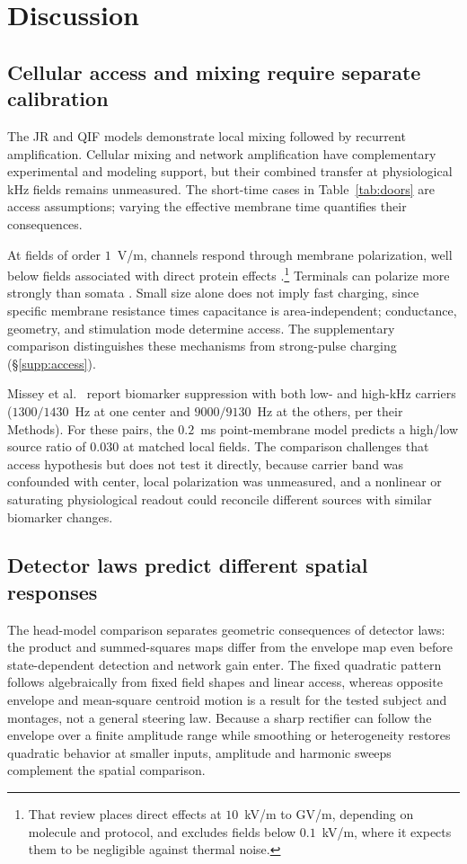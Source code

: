 \section{Discussion}\label{sec:discussion}
\subsection{Cellular access and mixing require separate calibration}
The JR and QIF models demonstrate local mixing followed by recurrent
amplification. Cellular mixing \cite{mirzakhalili2020,luff2024mixer} and network
amplification \cite{caldas2024,karimi2024,esmaeilpour2021} have complementary
experimental and modeling support, but their combined transfer at physiological
kHz fields remains unmeasured. The short-time cases in Table~\ref{tab:doors}
are access assumptions; varying the effective membrane time quantifies their
consequences.

At fields of order $1$~V/m, channels respond through membrane polarization,
well below fields associated with direct protein effects
\cite{cifra2026}.\footnote{That review places direct effects at $10$~kV/m
to GV/m, depending on molecule and protocol, and excludes fields below
$0.1$~kV/m, where it expects them to be negligible against thermal noise.}
Terminals can polarize more strongly than somata
\cite{rahman2013,aberra2023,chakraborty2018}. Small size alone does not imply
fast charging, since specific membrane resistance times capacitance is
area-independent; conductance, geometry, and stimulation mode determine access.
The supplementary comparison distinguishes these mechanisms from strong-pulse
charging (\S\ref{supp:access}).
\ifjne\else

\fi

Missey et al.\ \cite{missey2026} report biomarker suppression with both low- and
high-kHz carriers ($1300/1430$~Hz at one center and $9000/9130$~Hz at the others,
per their Methods). For these pairs, the $0.2$~ms point-membrane
model predicts a high/low source ratio of $0.030$ at matched local fields. The
comparison challenges that access hypothesis but does not test it directly, because
carrier band was confounded with center, local polarization was unmeasured, and a
nonlinear or saturating physiological readout could reconcile different sources
with similar biomarker changes.

\subsection{Detector laws predict different spatial responses}
The head-model comparison separates geometric consequences of detector laws:
the product and summed-squares maps differ from the envelope map even before
state-dependent detection and network gain enter. The fixed quadratic
pattern follows algebraically from fixed field shapes and linear access, whereas
opposite envelope and mean-square centroid motion is a result for the
tested subject and montages, not a general steering law. Because a sharp rectifier
can follow the envelope over a finite amplitude range while smoothing or
heterogeneity restores quadratic behavior at smaller inputs, amplitude and
harmonic sweeps complement the spatial comparison.

